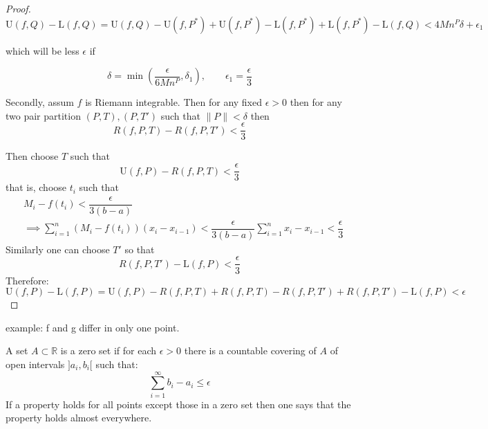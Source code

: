 \begin{proof}
    \begin{equation*}
        \text{U}(f,Q) - \text{L}(f,Q) = \text{U}(f,Q) - \text{U}(f,P^*) + \text{U}(f,P^*) - \text{L}(f,P^*)  + \text{L}(f,P^*) -  \text{L}(f,Q) < 4Mn^P\delta + \epsilon_1
    \end{equation*}

    which will be less \(\epsilon\) if

    \begin{equation*}
        \delta = \min{(\dfrac{\epsilon}{6Mn^P}, \delta_1)} , \qquad \epsilon_1 = \dfrac{\epsilon}{3}
    \end{equation*}

    Secondly, assum \(f\) is Riemann integrable. Then for any fixed \(\epsilon > 0\) then for any two pair partition \((P,T), (P,T')\) such that \(\|P\| < \delta\) then
    \begin{equation*}
        R(f,P,T) - R(f,P,T') < \dfrac{\epsilon}{3}
    \end{equation*}

    Then choose \(T\) such that
    \begin{equation*}
        \text{U}(f,P) - R(f,P,T) < \dfrac{\epsilon}{3}
    \end{equation*}
    that is, choose \(t_i\) such that
    \begin{align*}
         & M_i - f(t_i) < \dfrac{\epsilon}{3(b-a)}                                                                                                \\
         & \implies \sum_{i=1}^{n}{(M_i - f(t_i))(x_i - x_{i-1})} <\dfrac{\epsilon}{3(b-a)} \sum_{i = 1}^{n}{x_i - x_{i-1}} < \dfrac{\epsilon}{3}
    \end{align*}
    Similarly one can choose \(T'\) so that
    \begin{equation*}
        R(f,P,T')- \text{L}(f,P)  < \dfrac{\epsilon}{3}
    \end{equation*}
    Therefore:
    \begin{equation*}
        \text{U}(f,P) -  \text{L}(f,P) = \text{U}(f,P) - R(f,P,T) + R(f,P,T) - R(f,P,T') +  R(f,P,T')- \text{L}(f,P) < \epsilon
    \end{equation*}
\end{proof}
example: f and g differ in only one point.
\begin{definition}
    A set \(A \subset \mathbb{R}\) is a zero set if for each \(\epsilon > 0\) there is a countable covering of \(A\) of open intervals \(]a_i, b_i[\) such that:
    \begin{equation}
        \sum_{i = 1}^{\infty}{b_i - a_i} \leq \epsilon
    \end{equation}
    If a property holds for all points except those in a zero set then one says that the property holds almost everywhere.
\end{definition}

